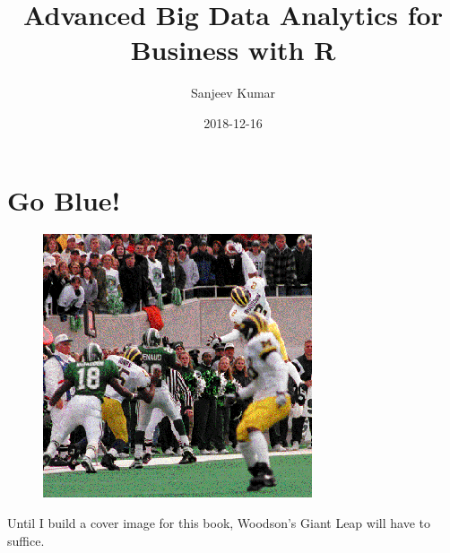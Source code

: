 \documentclass[]{krantz}
\title{Advanced Big Data Analytics for Business with R}
\author{Sanjeev Kumar}
\date{2018-12-16}
\renewenvironment{quote}{\begin{VF}}{\end{VF}}
\theoremstyle{definition}
\theoremstyle{definition}
\theoremstyle{definition}
\theoremstyle{remark}
\begin{document}
\maketitle


\thispagestyle{empty}

\begin{center}

\par{}

\end{center}

\setlength{\abovedisplayskip}{-5pt}
\setlength{\abovedisplayshortskip}{-5pt}

{
\hypersetup{linkcolor=black}
\setcounter{tocdepth}{2}
\tableofcontents
}
\listoftables
\listoffigures
\chapter*{Go Blue!}\label{go-blue}


\begin{figure}
\centering
\includegraphics{images/woodson.png}
\caption{}
\end{figure}

\begin{quote}
Until I build a cover image for this book, Woodson's Giant Leap will
have to suffice.
\end{quote}
\end{document}
